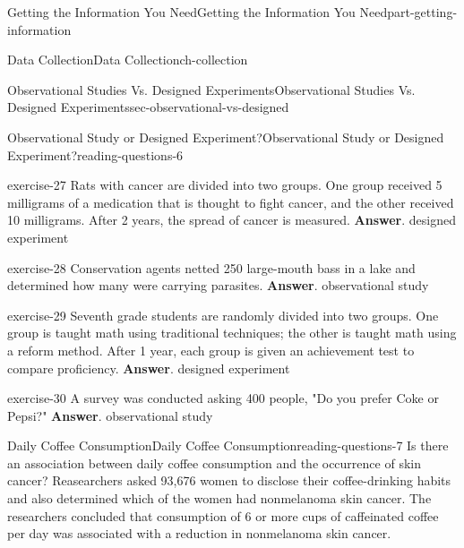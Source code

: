 \documentclass[oneside,10pt,]{book}
\numberwithin{equation}{section}
\begin{document}
\begin{partptx}{Getting the Information You Need}{}{Getting the Information You Need}{}{}{part-getting-information}
\begin{chapterptx}{Data Collection}{}{Data Collection}{}{}{ch-collection}
\begin{sectionptx}{Observational Studies Vs. Designed Experiments}{}{Observational Studies Vs. Designed Experiments}{}{}{sec-observational-vs-designed}
\typeout{************************************************}
%
\begin{reading-questions-subsection-numberless}{Observational Study or Designed Experiment?}{}{Observational Study or Designed Experiment?}{}{}{reading-questions-6}
\begin{divisionexercise}{1}{}{}{exercise-27}%
Rats with cancer are divided into two groups. One group received 5 milligrams of a medication that is thought to fight cancer, and the other received 10 milligrams. After 2 years, the spread of cancer is measured. \textbf{Answer}.\hypertarget{answer-27}{}\quad%
designed experiment\end{divisionexercise}%
\begin{divisionexercise}{2}{}{}{exercise-28}%
Conservation agents netted 250 large-mouth bass in a lake and determined how many were carrying parasites. \textbf{Answer}.\hypertarget{answer-28}{}\quad%
observational study\end{divisionexercise}%
\begin{divisionexercise}{3}{}{}{exercise-29}%
Seventh grade students are randomly divided into two groups. One group is taught math using traditional techniques; the other is taught math using a reform method. After 1 year, each group is given an achievement test to compare proficiency. \textbf{Answer}.\hypertarget{answer-29}{}\quad%
designed experiment\end{divisionexercise}%
\begin{divisionexercise}{4}{}{}{exercise-30}%
A survey was conducted asking 400 people, "Do you prefer Coke or Pepsi?" \textbf{Answer}.\hypertarget{answer-30}{}\quad%
observational study\end{divisionexercise}%
\end{reading-questions-subsection-numberless}
%
%
\typeout{************************************************}
\typeout{************************************************}
%
\begin{reading-questions-subsection-numberless}{Daily Coffee Consumption}{}{Daily Coffee Consumption}{}{}{reading-questions-7}
\hypertarget{p-7}{}%
Is there an association between daily coffee consumption and the occurrence of skin cancer? Reasearchers asked 93,676 women to disclose their coffee-drinking habits and also determined which of the women had nonmelanoma skin cancer. The researchers concluded that consumption of 6 or more cups of caffeinated coffee per day was associated with a reduction in nonmelanoma skin cancer.%

\end{reading-questions-subsection-numberless}
\end{sectionptx}
\end{chapterptx}
\end{partptx}
\end{document}
